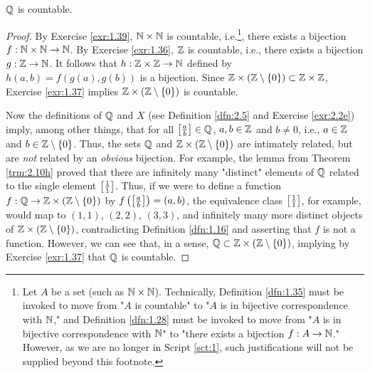 \documentclass[../main.tex]{subfiles}
\begin{document}
\begin{theorem}\label{trm:2.11}
    $\mathbb{Q}$ is countable.
    \begin{proof}
        By Exercise \ref{exr:1.39}, $\mathbb{N}\times\mathbb{N}$ is countable, i.e.\footnote{Let $A$ be a set (such as $\mathbb{N}\times\mathbb{N}$). Technically, Definition \ref{dfn:1.35} must be invoked to move from "$A$ is countable" to "$A$ is in bijective correspondence with $\mathbb{N}$," and Definition \ref{dfn:1.28} must be invoked to move from "$A$ is in bijective correspondence with $\mathbb{N}$" to "there exists a bijection $f:A\to\mathbb{N}$." However, as we are no longer in Script \ref{sct:1}, such justifications will not be supplied beyond this footnote.}, there exists a bijection $f:\mathbb{N}\times\mathbb{N}\to\mathbb{N}$. By Exercise \ref{exr:1.36}, $\mathbb{Z}$ is countable, i.e., there exists a bijection $g:\mathbb{Z}\to\mathbb{N}$. It follows that $h:\mathbb{Z}\times\mathbb{Z}\to\mathbb{N}$ defined by $h(a,b)=f(g(a),g(b))$ is a bijection. Since $\mathbb{Z}\times(\mathbb{Z}\setminus\{0\})\subset\mathbb{Z}\times\mathbb{Z}$, Exercise \ref{exr:1.37} implies $\mathbb{Z}\times(\mathbb{Z}\setminus\{0\})$ is countable.\par
        Now the definitions of $\mathbb{Q}$ and $X$ (see Definition \ref{dfn:2.5} and Exercise \ref{exr:2.2e}) imply, among other things, that for all $\left[ \frac{a}{b} \right]\in\mathbb{Q}$, $a,b\in\mathbb{Z}$ and $b\neq 0$, i.e., $a\in \mathbb{Z}$ and $b\in\mathbb{Z}\setminus\{0\}$. Thus, the sets $\mathbb{Q}$ and $\mathbb{Z}\times(\mathbb{Z}\setminus\{0\})$ are intimately related, but are \emph{not} related by an \emph{obvious} bijection. For example, the lemma from Theorem \ref{trm:2.10h} proved that there are infinitely many "distinct" elements of $\mathbb{Q}$ related to the single element $\left[ \frac{1}{1} \right]$. Thus, if we were to define a function $f:\mathbb{Q}\to\mathbb{Z}\times(\mathbb{Z}\setminus\{0\})$ by $f\left( \left[ \frac{a}{b} \right] \right)=(a,b)$, the equivalence class $\left[ \frac{1}{1} \right]$, for example, would map to $(1,1)$, $(2,2)$, $(3,3)$, and infinitely many more distinct objects of $\mathbb{Z}\times(\mathbb{Z}\setminus\{0\})$, contradicting Definition \ref{dfn:1.16} and asserting that $f$ is not a function. However, we can see that, in a sense, $\mathbb{Q}\subset\mathbb{Z}\times(\mathbb{Z}\setminus\{0\})$, implying by Exercise \ref{exr:1.37} that $\mathbb{Q}$ is countable.
    \end{proof}
\end{theorem}
\end{document}
